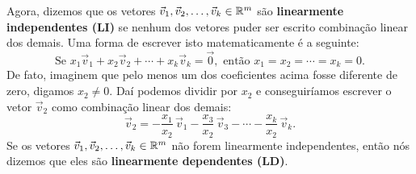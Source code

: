 \documentclass[../livro.tex]{subfiles}
\begin{document}
Agora, dizemos que os vetores $\vec{v}_1, \vec{v}_2, \dots, \vec{v}_k  \in \mathbb{R}^m$ são \textbf{linearmente independentes (LI)} se nenhum dos vetores puder ser escrito combinação linear dos demais. Uma forma de escrever isto matematicamente é a seguinte:
\begin{equation}
\boxed{\text{Se } x_1 \vec{v}_1 + x_2 \vec{v}_2 + \cdots + x_k \vec{v}_k = \vec{0}, \text{ então } x_1 = x_2 = \cdots = x_k = 0.}
\end{equation} De fato, imaginem que pelo menos um dos coeficientes acima fosse diferente de zero, digamos $x_2 \neq 0$. Daí podemos dividir por $x_2$ e conseguiríamos escrever o vetor $\vec{v}_2$ como combinação linear dos demais:
\begin{equation}
\vec{v}_2 = - \frac{x_1}{x_2} \, \vec{v}_1 - \frac{x_3}{x_2} \, \vec{v}_3 - \cdots - \frac{x_k}{x_2} \, \vec{v}_k.
\end{equation} Se os vetores $\vec{v}_1, \vec{v}_2, \dots, \vec{v}_k  \in \mathbb{R}^m$ não forem linearmente independentes, então nós dizemos que eles são \textbf{linearmente dependentes (LD)}.
\end{document}
